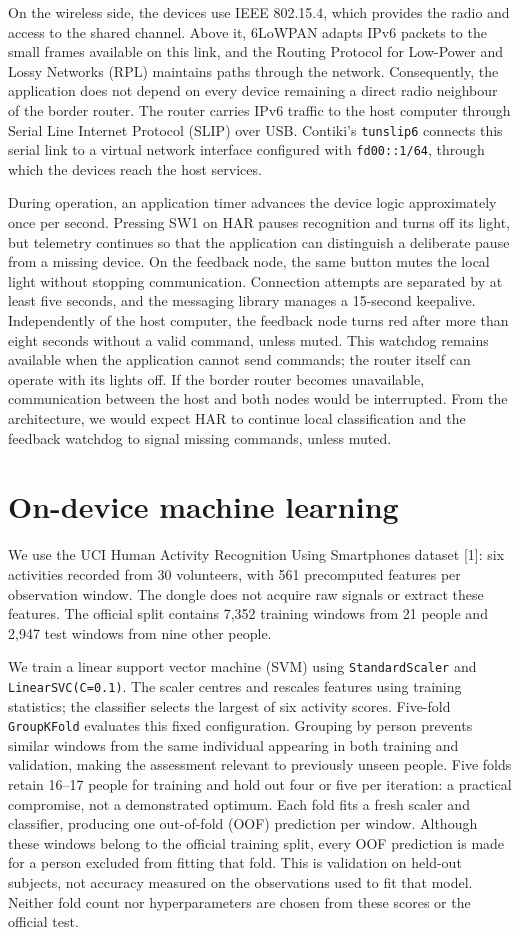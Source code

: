 \documentclass[11pt,a4paper]{article}
\newcommand{\file}[1]{\nolinkurl{#1}}
\newcommand{\reportsection}[1]{\section{#1}}
\begin{document}
On the wireless side, the devices use IEEE 802.15.4, which provides the radio and access to the shared channel. Above it, 6LoWPAN adapts IPv6 packets to the small frames available on this link, and the Routing Protocol for Low-Power and Lossy Networks (RPL) maintains paths through the network. Consequently, the application does not depend on every device remaining a direct radio neighbour of the border router. The router carries IPv6 traffic to the host computer through Serial Line Internet Protocol (SLIP) over USB. Contiki's \texttt{tunslip6} connects this serial link to a virtual network interface configured with \file{fd00::1/64}, through which the devices reach the host services.

During operation, an application timer advances the device logic approximately once per second. Pressing SW1 on HAR pauses recognition and turns off its light, but telemetry continues so that the application can distinguish a deliberate pause from a missing device. On the feedback node, the same button mutes the local light without stopping communication. Connection attempts are separated by at least five seconds, and the messaging library manages a 15-second keepalive. Independently of the host computer, the feedback node turns red after more than eight seconds without a valid command, unless muted. This watchdog remains available when the application cannot send commands; the router itself can operate with its lights off. If the border router becomes unavailable, communication between the host and both nodes would be interrupted. From the architecture, we would expect HAR to continue local classification and the feedback watchdog to signal missing commands, unless muted.
\reportsection{On-device machine learning}
We use the UCI Human Activity Recognition Using Smartphones dataset [1]: six activities recorded from 30 volunteers, with 561 precomputed features per observation window. The dongle does not acquire raw signals or extract these features. The official split contains 7,352 training windows from 21 people and 2,947 test windows from nine other people.

We train a linear support vector machine (SVM) using \texttt{StandardScaler} and \texttt{LinearSVC(C=0.1)}. The scaler centres and rescales features using training statistics; the classifier selects the largest of six activity scores. Five-fold \texttt{GroupKFold} evaluates this fixed configuration. Grouping by person prevents similar windows from the same individual appearing in both training and validation, making the assessment relevant to previously unseen people. Five folds retain 16--17 people for training and hold out four or five per iteration: a practical compromise, not a demonstrated optimum. Each fold fits a fresh scaler and classifier, producing one out-of-fold (OOF) prediction per window. Although these windows belong to the official training split, every OOF prediction is made for a person excluded from fitting that fold. This is validation on held-out subjects, not accuracy measured on the observations used to fit that model. Neither fold count nor hyperparameters are chosen from these scores or the official test.
\end{document}
